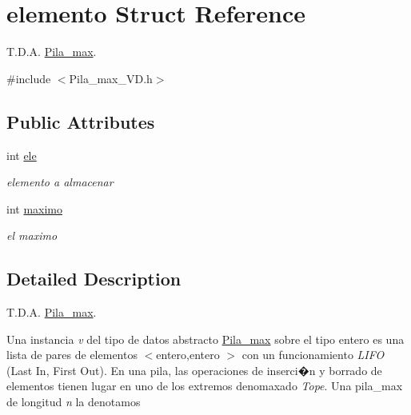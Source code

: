 \hypertarget{structelemento}{}\section{elemento Struct Reference}
\label{structelemento}


T.\+D.\+A. \mbox{\hyperlink{classPila__max}{Pila\+\_\+max}}.  




{\ttfamily \#include $<$Pila\+\_\+max\+\_\+\+V\+D.\+h$>$}

\subsection*{Public Attributes}
\begin{DoxyCompactItemize}
\item 
\mbox{\label{structelemento_a954579dc7ed0033eefa875742ece867b}} 
int \mbox{\hyperlink{structelemento_a954579dc7ed0033eefa875742ece867b}{ele}}
\begin{DoxyCompactList}\small\item\em elemento a almacenar \end{DoxyCompactList}\item 
\mbox{\label{structelemento_aefc00344a4cf9303417ccab8158bb803}} 
int \mbox{\hyperlink{structelemento_aefc00344a4cf9303417ccab8158bb803}{maximo}}
\begin{DoxyCompactList}\small\item\em el maximo \end{DoxyCompactList}\end{DoxyCompactItemize}


\subsection{Detailed Description}
T.\+D.\+A. \mbox{\hyperlink{classPila__max}{Pila\+\_\+max}}. 

Una instancia {\itshape v} del tipo de datos abstracto \mbox{\hyperlink{classPila__max}{Pila\+\_\+max}} sobre el tipo {\ttfamily entero} es una lista de pares de elementos $<$entero,entero $>$ con un funcionamiento {\itshape L\+I\+FO} (Last In, First Out). En una pila, las operaciones de inserci�n y borrado de elementos tienen lugar en uno de los extremos denomaxado {\itshape Tope}. Una pila\+\_\+max de longitud {\itshape n} la denotamos


